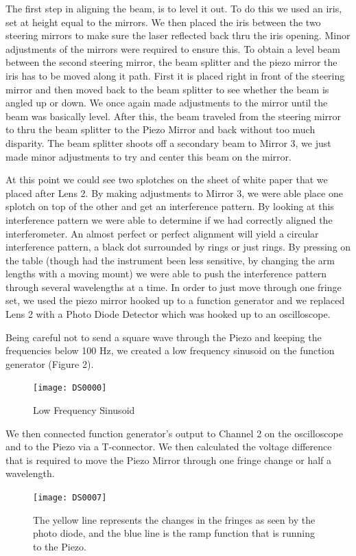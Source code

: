 The first step in aligning the beam, is to level it out. To do this we used an iris, set at height equal to the mirrors. We then placed the iris between the two steering mirrors to make sure the laser reflected back thru the iris opening. Minor adjustments of the mirrors were required to ensure this.  To obtain a level beam between the second steering mirror, the beam splitter and the piezo mirror the iris has to be moved along it path. First it is placed right in front of the steering mirror and then moved back to the beam splitter to see whether the beam is angled up or down. We once again made adjustments to the mirror until the beam was basically level. After this, the beam traveled from the steering mirror to thru the beam splitter to the Piezo Mirror and back without too much disparity. The beam splitter shoots off a secondary beam to Mirror 3, we just made minor adjustments to try and center this beam on the mirror. 

At this point we could see two splotches on the sheet of white paper that we placed after Lens 2. By making adjustments to Mirror 3, we were able place one splotch on top of the other and get an interference pattern. By looking at this interference pattern we were able to determine if we had correctly aligned the interferometer. An almost perfect or perfect alignment will yield a circular interference pattern, a black dot surrounded by rings or just rings. By pressing on the table (though had the instrument been less sensitive, by changing the arm lengths with a moving mount) we were able to push the interference pattern through several wavelengths at a time. In order to just move through one fringe set, we used the piezo mirror hooked up to a function generator and we replaced Lens 2 with a Photo Diode Detector which was hooked up to an oscilloscope.

Being careful not to send a square wave through the Piezo and keeping the frequencies below 100 Hz, we created a low frequency sinusoid on the function generator (Figure 2).

		\begin{figure}[ht!]
		\centering
		\texttt{[image: DS0000]}
		\caption{Low Frequency Sinusoid}
		\end{figure}

We then connected function generator's output to Channel 2 on the oscilloscope and to the Piezo via a T-connector. We then calculated the voltage difference that is required to move the Piezo Mirror through one fringe change or half a wavelength.

		\begin{figure}[ht!]
		\centering
		\texttt{[image: DS0007]}
		\caption{The yellow line represents the changes in the fringes as seen by the photo diode, and the blue line is the ramp function that is running to the Piezo.}
		\end{figure}
